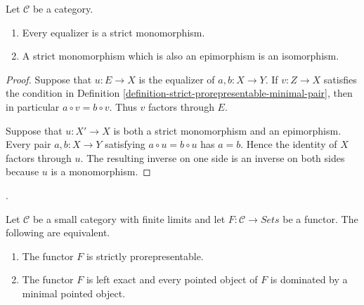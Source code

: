 \begin{lemma}
\label{lemma-strict-monomorphism-properties}
Let $\mathcal{C}$ be a category.
\begin{enumerate}
\item Every equalizer is a strict monomorphism.
\item A strict monomorphism which is also an epimorphism is an isomorphism.
\end{enumerate}
\end{lemma}

\begin{proof}
Suppose that $u : E \to X$ is the equalizer of $a, b : X \to Y$.
If $v : Z \to X$ satisfies the condition in
Definition \ref{definition-strict-prorepresentable-minimal-pair}, then in
particular $a \circ v = b \circ v$. Thus $v$ factors through $E$.

Suppose that $u : X' \to X$ is both a strict monomorphism and an
epimorphism. Every pair $a, b : X \to Y$ satisfying
$a \circ u = b \circ u$ has $a = b$. Hence the identity of $X$ factors
through $u$. The resulting inverse on one side is an inverse on both sides
because $u$ is a monomorphism.
\end{proof}

\begin{theorem}
\label{theorem-strict-prorepresentable-minimal-pairs}
\begin{reference}
\cite[Expos\'e 195, n\textsuperscript{o} A.3, pp. 373--374]{FGA}.
\end{reference}
Let $\mathcal{C}$ be a small category with finite limits and let
$F : \mathcal{C} \to \textit{Sets}$ be a functor. The following are
equivalent.
\begin{enumerate}
\item The functor $F$ is strictly prorepresentable.
\item The functor $F$ is left exact and every pointed object of $F$ is
dominated by a minimal pointed object.
\end{enumerate}
\end{theorem}

